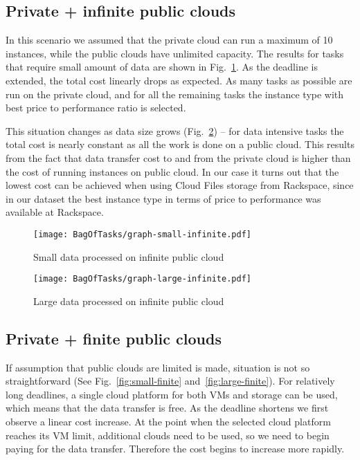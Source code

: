 {\subsection{Private + infinite public clouds}
\label{sec:bot:private-infinite} 
  In this scenario we assumed that the private cloud can run a maximum of 10 instances, while the public clouds have unlimited capacity. The results for tasks that require small amount of data are shown in Fig.~\ref{fig:small-infinite}. As the deadline is extended, the total cost linearly drops as expected. As many tasks as possible are run on the private cloud, and for all the remaining tasks the instance type with best price to performance ratio is selected.
    
  This situation changes as data size grows (Fig.~\ref{fig:large-infinite}) -- for data intensive tasks the total cost is nearly constant as all the work is done on a public cloud. This results from the fact that data transfer cost to and from the private cloud is higher than the cost of running instances on public cloud. In our case it turns out that the lowest cost can be achieved when using Cloud Files storage from Rackspace, since in our dataset the best instance type in terms of price to performance was available at Rackspace. 
        
  \begin{figure}[tb] 
     \centering
     \texttt{[image: BagOfTasks/graph-small-infinite.pdf]}
     \caption{Small data processed on infinite public cloud\label{fig:small-infinite}}
     
  \end{figure}

  \begin{figure}[tb] 
     \centering
     \texttt{[image: BagOfTasks/graph-large-infinite.pdf]}
     \caption{Large data processed on infinite public cloud\label{fig:large-infinite}}
  \end{figure}        
    
\subsection{Private + finite public clouds}
\label{sec:bot:private-finite}
    
  If assumption that public clouds are limited is made, situation is not so straightforward (See Fig.~\ref{fig:small-finite} and~\ref{fig:large-finite}). For relatively long deadlines, a single cloud platform for both VMs and storage can be used, which means that the data transfer is free. As the deadline shortens we first observe a linear cost increase. At the point when the selected cloud platform reaches its VM limit, additional clouds need to be used, so we need to begin paying for the data transfer. Therefore the cost begins to increase more rapidly.
  
}
